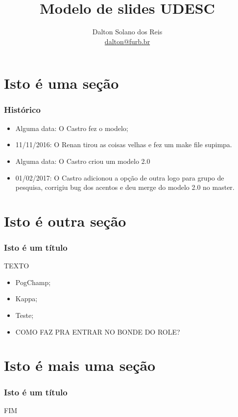\documentclass{beamer}
\title[Modelo Slides UDESC]{Modelo de slides UDESC}
\author[Dalton Solano dos Reis]{
  Dalton Solano dos Reis\texorpdfstring{\\\medskip}{}%
  {\small \href{mailto:dalton@furb.br}{dalton@furb.br}}}
\institute[UDESC]{
  Centro de Ciências e Tecnológicas\\
  Universidade do Estado de Santa Catarina}
\begin{document}
\begin{frame}
  \titlepage

\end{frame}

\section{Isto é uma seção}
\begin{frame}
  \frametitle{Histórico}

  \begin{itemize}
  \item Alguma data: O Castro fez o modelo;
  \item 11/11/2016: O Renan tirou as coisas velhas e fez um make file supimpa.
  \item Alguma data: O Castro criou um modelo 2.0
  \item 01/02/2017: O Castro adicionou a opção de outra logo para grupo de pesquisa, corrigiu bug dos acentos e deu merge do modelo 2.0 no master.
  \end{itemize}
\end{frame}

\section{Isto é outra seção}
\begin{frame}
  \frametitle{Isto é um título}

  TEXTO
  \begin{itemize}
  \item PogChamp;
  \item Kappa;
  \item Teste;
  \item COMO FAZ PRA ENTRAR NO BONDE DO ROLE?
  \end{itemize}
\end{frame}

\section{Isto é mais uma seção}
\begin{frame}
  \frametitle{Isto é um título}

  FIM
\end{frame}
\end{document}
